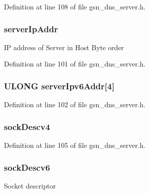 Definition at line 108 of file gsn\_\-dns\_\-server.h.

\hypertarget{a00055_a09261ac30de0001f89753c8f3869ad2f}{
\subsubsection[{serverIpAddr}]{ {\bf serverIpAddr}}}
\label{a00055_a09261ac30de0001f89753c8f3869ad2f}
IP address of Server in Host Byte order 

Definition at line 101 of file gsn\_\-dns\_\-server.h.

\hypertarget{a00055_a7f1f7891e264201060f498798b450a8b}{
\subsubsection[{serverIpv6Addr}]{\setlength{\rightskip}{0pt plus 5cm}ULONG {\bf serverIpv6Addr}\mbox{[}4\mbox{]}}}
\label{a00055_a7f1f7891e264201060f498798b450a8b}


Definition at line 102 of file gsn\_\-dns\_\-server.h.

\hypertarget{a00055_a4074c310b3e312fa174c6fa7c211cbad}{
\subsubsection[{sockDescv4}]{ {\bf sockDescv4}}}
\label{a00055_a4074c310b3e312fa174c6fa7c211cbad}


Definition at line 105 of file gsn\_\-dns\_\-server.h.

\hypertarget{a00055_a8edc1f578eda1ef92041687d5d0b5a0c}{
\subsubsection[{sockDescv6}]{ {\bf sockDescv6}}}
\label{a00055_a8edc1f578eda1ef92041687d5d0b5a0c}
Socket descriptor 

